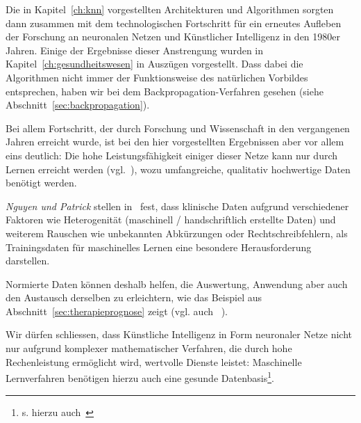 Die in Kapitel~\ref{ch:knn} vorgestellten Architekturen und Algorithmen sorgten dann zusammen mit dem technologischen Fortschritt für ein erneutes Aufleben der Forschung an neuronalen Netzen und Künstlicher Intelligenz in den 1980er Jahren.
Einige der Ergebnisse dieser Anstrengung wurden in Kapitel~\ref{ch:gesundheitswesen} in Auszügen vorgestellt.
Dass dabei die Algorithmen nicht immer der Funktionsweise des natürlichen Vorbildes entsprechen, haben wir bei dem Backpropagation-Verfahren gesehen (siehe Abschnitt~\ref{sec:backpropagation}).

Bei allem Fortschritt, der durch Forschung und Wissenschaft in den vergangenen Jahren erreicht wurde, ist bei den hier vorgestellten Ergebnissen aber vor allem eins deutlich: Die hohe Leistungsfähigkeit einiger dieser Netze kann nur durch Lernen erreicht werden (vgl.~\cite[40]{AHR19}), wozu umfangreiche, qualitativ hochwertige Daten benötigt werden.

\textit{Nguyen und Patrick} stellen in~\cite{NP16} fest, dass klinische Daten aufgrund verschiedener Faktoren wie Heterogenität (maschinell / handschriftlich erstellte Daten) und weiterem Rauschen wie unbekannten Abkürzungen oder Rechtschreibfehlern, als Trainingsdaten für maschinelles Lernen eine besondere Herausforderung darstellen.

Normierte Daten können deshalb helfen, die Auswertung, Anwendung aber auch den Austausch derselben zu erleichtern, wie das Beispiel aus Abschnitt~\ref{sec:therapieprognose} zeigt (vgl. auch ~\cite[42]{AHR19}).

Wir dürfen schliessen, dass Künstliche Intelligenz in Form neuronaler Netze nicht nur aufgrund komplexer mathematischer Verfahren, die durch hohe Rechenleistung ermöglicht wird, wertvolle Dienste leistet: Maschinelle Lernverfahren benötigen hierzu auch eine gesunde Datenbasis\footnote{s. hierzu auch~\cite{SSM+19}}.












%
%
%
%

